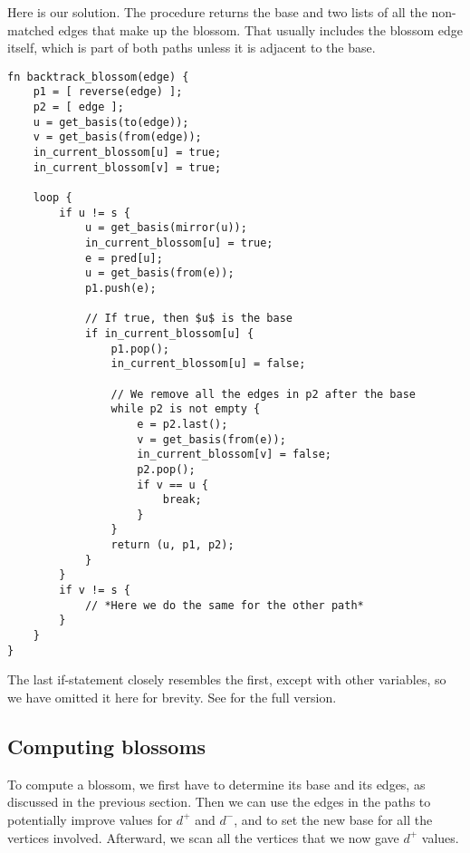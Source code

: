 Here is our solution. The procedure returns the base and two lists of all the non-matched edges that make up the blossom. That usually includes the blossom edge itself, which is part of both paths unless it is adjacent to the base.
\begin{lstlisting}[caption={Backtrack blossom},label=Listing,mathescape=true]
fn backtrack_blossom(edge) {
    p1 = [ reverse(edge) ];
    p2 = [ edge ];
    u = get_basis(to(edge));
    v = get_basis(from(edge));
    in_current_blossom[u] = true;
    in_current_blossom[v] = true;

    loop {
        if u != s {
            u = get_basis(mirror(u));
            in_current_blossom[u] = true;
            e = pred[u];
            u = get_basis(from(e));
            p1.push(e);

            // If true, then $u$ is the base
            if in_current_blossom[u] { 
                p1.pop();
                in_current_blossom[u] = false;

                // We remove all the edges in p2 after the base
                while p2 is not empty {
                    e = p2.last();
                    v = get_basis(from(e));
                    in_current_blossom[v] = false;
                    p2.pop();
                    if v == u {
                        break;
                    }
                }
                return (u, p1, p2);
            }
        }
        if v != s {
            // *Here we do the same for the other path*
        }
    }
}
\end{lstlisting}
The last if-statement closely resembles the first, except with other variables, so we have omitted it here for brevity. See  for the full version.

\subsection{Computing blossoms}
To compute a blossom, we first have to determine its base and its edges, as discussed in the previous section. Then we can use the edges in the paths to potentially improve values for $d^+$ and $d^-$, and to set the new base for all the vertices involved. Afterward, we scan all the vertices that we now gave $d^+$ values.

